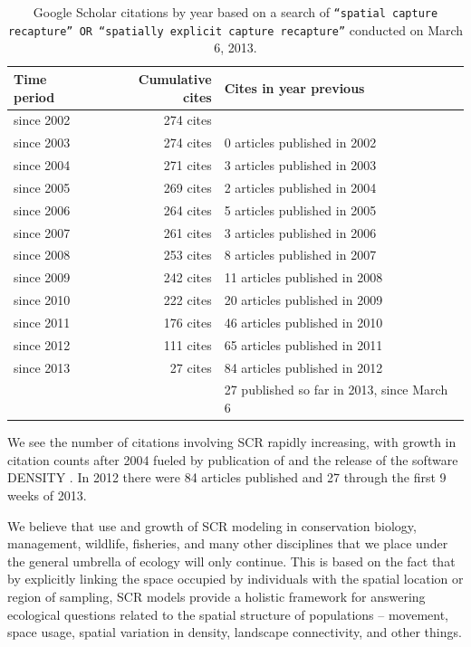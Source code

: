 \begin{table}[ht]
\caption{Google Scholar citations by year based on a search of
\mbox{\tt ``spatial capture recapture'' OR ``spatially explicit
capture recapture''} conducted on March 6, 2013. 
}
\begin{tabular}{lrl} \hline \hline
Time period & Cumulative cites & Cites in year previous \\ \hline
since 2002 & 274 cites & \\
since 2003 & 274 cites &0 articles published in 2002 \\
since 2004 & 271 cites &3 articles published in 2003 \\
since 2005 & 269 cites &2 articles published in 2004 \\
since 2006 & 264 cites &5 articles published in 2005 \\
since 2007 & 261 cites &3 articles published in 2006 \\
since 2008 & 253 cites &8 articles published in 2007 \\
since 2009 & 242 cites &11 articles published in 2008 \\ 
since 2010 & 222 cites &20 articles published in 2009 \\
since 2011 & 176 cites &46 articles published in 2010 \\
since 2012 & 111 cites &65 articles published in 2011 \\
since 2013 & 27 cites &84 articles published in 2012 \\
& &27 published so far in 2013, since March 6
\\ \hline
\end{tabular}
\label{last.tab.cites}
\end{table}

We see the number of citations involving SCR rapidly increasing, 
with growth in citation counts after 2004 fueled by publication of
\citet{efford:2004} and the release of the software DENSITY
\citep{efford_etal:2004}. In 2012 there were 84 articles published and
27 through the first 9 weeks of 2013.

We believe that use and growth of SCR modeling in conservation biology, 
management, wildlife, fisheries, and many other disciplines that we place under
the general umbrella of ecology will only continue. 
This is based on the fact that by explicitly linking the space occupied by individuals with the
spatial location or region of sampling, SCR models 
provide a holistic framework for answering ecological questions
related to the spatial structure of populations -- movement, space
usage, spatial variation in density, landscape connectivity, and other
things. 

